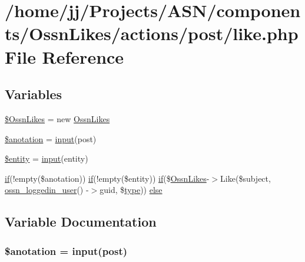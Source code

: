 \hypertarget{post_2like_8php}{}\section{/home/jj/\+Projects/\+A\+S\+N/components/\+Ossn\+Likes/actions/post/like.php File Reference}
\label{post_2like_8php}
\subsection*{Variables}
\begin{DoxyCompactItemize}
\item 
\hyperlink{post_2like_8php_a227f36ff099a95468945a2fabc5c0782}{\$\+Ossn\+Likes} = new \hyperlink{class_ossn_likes}{Ossn\+Likes}
\item 
\hyperlink{post_2like_8php_af900958147bf7360167d1927035a1e9a}{\$anotation} = \hyperlink{ossn_8lib_8input_8php_a64ebee98b041c4f75f71ed3cd73cc8ed}{input}(\textquotesingle{}post\textquotesingle{})
\item 
\hyperlink{post_2like_8php_a74ed34e6d7bc9f3f8c4fb58a12247ee2}{\$entity} = \hyperlink{ossn_8lib_8input_8php_a64ebee98b041c4f75f71ed3cd73cc8ed}{input}(\textquotesingle{}entity\textquotesingle{})
\item 
\hyperlink{jquery_8tokeninput_8js_ad8dd46a3cbc004569e34401e9e71771a}{if}(!empty(\$anotation)) \hyperlink{jquery_8tokeninput_8js_ad8dd46a3cbc004569e34401e9e71771a}{if}(!empty(\$entity)) \hyperlink{jquery_8tokeninput_8js_ad8dd46a3cbc004569e34401e9e71771a}{if}(\$\hyperlink{class_ossn_likes}{Ossn\+Likes}-\/$>$Like(\$subject, \hyperlink{ossn_8lib_8users_8php_aa3c8068d0e6638b414d6a2f6c62565b8}{ossn\+\_\+loggedin\+\_\+user}() -\/$>$guid, \$\hyperlink{_ossn_wall_2actions_2wall_2post_2group_8php_a2dc1bb4e1ed0029daa81ac0776b14b51}{type})) \hyperlink{post_2like_8php_a3aaa36ba6f23d1f679c0e517506ae7b6}{else}
\end{DoxyCompactItemize}


\subsection{Variable Documentation}
\subsubsection[{\texorpdfstring{\$anotation}{$anotation}}]{\setlength{\rightskip}{0pt plus 5cm}\$anotation = {\bf input}(\textquotesingle{}post\textquotesingle{})}\hypertarget{post_2like_8php_af900958147bf7360167d1927035a1e9a}{}\label{post_2like_8php_af900958147bf7360167d1927035a1e9a}


